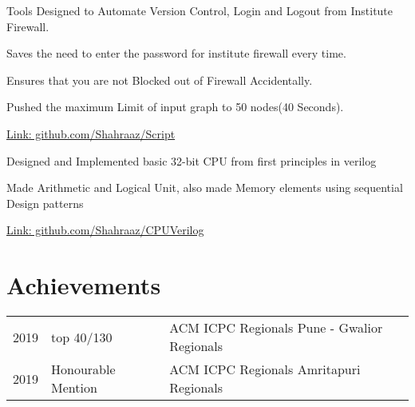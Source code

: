 \documentclass[]{deedy-resume-openfont}
\begin{document}
\begin{minipage}[t]{0.66\textwidth}
\vspace{\topsep} %
\begin{tightemize}
\item Tools Designed to Automate Version Control, Login and Logout from Institute Firewall.
\item Saves the need to enter the password for institute firewall every time.
\item Ensures that you are not Blocked out of Firewall Accidentally.
\item Pushed the maximum Limit of input graph to 50 nodes(40 Seconds).
\item \href{https://github.com/Shahraaz/Script}{Link: github.com/Shahraaz/Script}
\end{tightemize}
\sectionsep

\vspace{\topsep} %
\begin{tightemize}
\item Designed and Implemented basic 32-bit CPU from first principles in verilog
\item Made Arithmetic and Logical Unit, also made Memory elements using
sequential Design patterns
\item \href{https://github.com/Shahraaz/CPUVerilog}{Link: github.com/Shahraaz/CPUVerilog}
\end{tightemize}
\sectionsep


\section{Achievements} 
\begin{tabular}{rll}
2019	     & top 40/130  & ACM ICPC Regionals Pune - Gwalior Regionals\\
2019	     & Honourable Mention  & ACM ICPC Regionals Amritapuri Regionals\\
\end{tabular}
\sectionsep

\end{minipage} 
\end{document}
